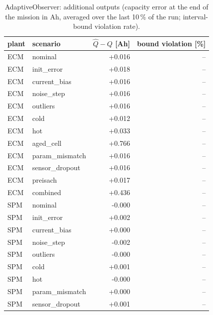\begin{table}[H]\centering\small\caption{AdaptiveObserver: additional outputs (capacity error at the end of the mission in Ah, averaged over the last 10\,\% of the run; interval-bound violation rate).}\label{tab:cellx_AdaptiveObserver}
\begin{tabular}{llrr}\toprule plant & scenario & $\hat Q - Q$ [Ah] & bound violation [\%] \\ \midrule
ECM & nominal & +0.016 & -- \\
ECM & init\_error & +0.018 & -- \\
ECM & current\_bias & +0.016 & -- \\
ECM & noise\_step & +0.016 & -- \\
ECM & outliers & +0.016 & -- \\
ECM & cold & +0.012 & -- \\
ECM & hot & +0.033 & -- \\
ECM & aged\_cell & +0.766 & -- \\
ECM & param\_mismatch & +0.016 & -- \\
ECM & sensor\_dropout & +0.016 & -- \\
ECM & preisach & +0.017 & -- \\
ECM & combined & +0.436 & -- \\
SPM & nominal & -0.000 & -- \\
SPM & init\_error & +0.002 & -- \\
SPM & current\_bias & +0.000 & -- \\
SPM & noise\_step & -0.002 & -- \\
SPM & outliers & -0.000 & -- \\
SPM & cold & +0.001 & -- \\
SPM & hot & -0.000 & -- \\
SPM & param\_mismatch & +0.000 & -- \\
SPM & sensor\_dropout & +0.001 & -- \\
\bottomrule\end{tabular}\end{table}
